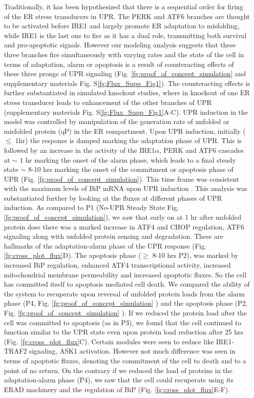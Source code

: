 \documentclass[12pt]{article}
\begin{document}
Traditionally, it has been hypothesized that there is a sequential order for firing of the ER stress transducers in UPR. The PERK and ATF6 branches are thought to be activated before IRE1 \cite{szegezdi2006mediators} and largely promote ER adaptation to misfolding, while IRE1 is the last one to fire as it has a dual role, transmitting both survival and pro-apoptotic signals. However our modeling analysis suggests that these three branches fire simultaneously with varying rates and the state of the cell in terms of adaptation, alarm or apoptosis is a result of counteracting effects of these three prongs of UPR signaling (Fig. \ref{fg:proof_of_concept_simulation} and supplementary materials Fig. S\ref{fg:Flux_Supp_Fig1}). The counteracting effects is further substantiated in simulated knockout studies, where in knockout of one ER stress transducer leads to enhancement of the other branches of UPR (supplementary materials Fig. S\ref{fg:Flux_Supp_Fig1}A-C). UPR induction in the model was controlled by manipulation of the generation rate of unfolded or misfolded protein (qP) in the ER compartment. Upon UPR induction, initially ($\leq$ 1hr) the response is damped marking the adaptation phase of UPR. This is followed by an increase in the activity of the IRE1$\alpha$, PERK and ATF6 cascades at $\sim$ 1 hr marking the onset of the alarm phase, which leads to a final steady state $\sim$ 8-10 hrs marking the onset of the commitment or apoptosis phase of UPR (Fig. \ref{fg:proof_of_concept_simulation}). This time frame was consistent with the maximum levels of BiP mRNA upon UPR induction \cite{lin2007ire1}. This analysis was substantiated further by looking at the fluxes at different phases of UPR induction. As compared to P1 (No-UPR Steady State Fig. \ref{fg:proof_of_concept_simulation}), we saw that early on at 1 hr after unfolded protein dose there was a marked increase in ATF4 and CHOP regulation, ATF6 signaling along with unfolded protein sensing and degradation. These are hallmarks of the adaptation-alarm phase of the UPR response (Fig. \ref{fg:cross_plot_flux}D). The apoptosis phase ($\geq$ 8-10 hrs P2), was marked by increased BiP regulation, enhanced ATF4 transcriptional activity, increased mitochondrial membrane permeability and increased apoptotic fluxes. So the cell has committed itself to apoptosis mediated cell death. We compared the ability of the system to recuperate upon reversal of unfolded protein loads from the alarm phase (P4, Fig. \ref{fg:proof_of_concept_simulation} ) and the apoptosis phase (P2, Fig. \ref{fg:proof_of_concept_simulation} ). If we reduced the protein load after the cell was committed to apoptosis (as in P3), we found that the cell continued to function similar to the UPR state even upon protein load reduction after 25 hrs (Fig. \ref{fg:cross_plot_flux}C). Certain modules were seen to reduce like IRE1-TRAF2 signaling, ASK1 activation. However not much difference was seen in terms of apoptotic fluxes, denoting the commitment of the cell to death and to a point of no return. On the contrary if we reduced the load of proteins in the adaptation-alarm phase (P4), we saw that the cell could recuperate using its ERAD machinery and the regulation of BiP (Fig. \ref{fg:cross_plot_flux}E-F). 
\end{document}
